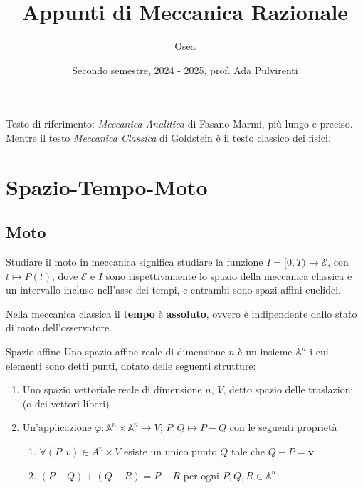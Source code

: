 

\title{Appunti di Meccanica Razionale}
\author{Osea}
\date{Secondo semestre, 2024 \-- 2025, prof. Ada Pulvirenti}



\maketitle

Testo di riferimento: \emph{Meccanica Analitica} di Fasano Marmi, più lungo e
preciso. Mentre il testo \emph{Meccanica Classica} di Goldstein è il testo
classico dei fisici. 

\section{Spazio-Tempo-Moto}
\subsection{Moto}
Studiare il moto in meccanica significa studiare la funzione \(I = [0, T) \to
\mathcal{E}\), con \(t \mapsto P(t)\), dove \(\mathcal{E}\) e \(I\) sono
rispettivamente lo spazio della meccanica classica e un intervallo incluso
nell'asse dei tempi, e entrambi sono spazi affini euclidei.
\begin{notebox}
    Nella meccanica classica il \textbf{tempo} è \textbf{assoluto}, ovvero è
    indipendente dallo stato di moto dell'osservatore.
\end{notebox}
\begin{definition}{Spazio affine}
    Uno spazio affine reale di dimensione \(n\) è un insieme \(\mathbb{A} ^n\) i
    cui elementi sono detti punti, dotato delle seguenti strutture:
\begin{enumerate}[label = \arabic*.]
    \item Uno spazio vettoriale reale di dimensione \(n\), \(V\), detto spazio
        delle traslazioni (o dei vettori liberi)
\item Un'applicazione \(\varphi : \mathbb{A}^{n} \times  \mathbb{A}^{n} \to
        V\); \(P, Q \mapsto P - Q\)  con le seguenti proprietà
        \begin{enumerate}[label = \alph*.]
            \item \(\forall (P, v) \in  A^{n} \times  V\) esiste un unico punto
                \(Q\) tale che \(Q - P = \mathbf{v} \) 
            \item \((P - Q) + (Q - R) = P - R\) per ogni \(P, Q, R \in
                \mathbb{A}^{n}\) 
        \end{enumerate}
\end{enumerate}
\end{definition}

